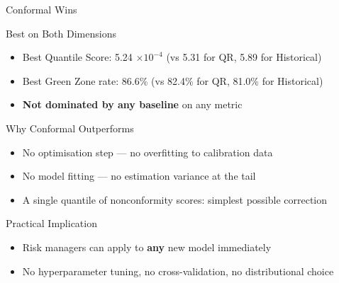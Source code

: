 \documentclass[9pt, aspectratio=169, t]{beamer}
\begin{document}
\begin{frame}{Conformal Wins}
	\vspace{-0.3cm}
	{\footnotesize
	\begin{exampleblock}{Best on Both Dimensions}
		\begin{itemize}\setlength{\itemsep}{1pt}
			\item Best Quantile Score: 5.24 $\times 10^{-4}$ (vs 5.31 for QR, 5.89 for Historical)
			\item Best Green Zone rate: 86.6\% (vs 82.4\% for QR, 81.0\% for Historical)
			\item \textbf{Not dominated by any baseline} on any metric
		\end{itemize}
	\end{exampleblock}
	\begin{block}{Why Conformal Outperforms}
		\begin{itemize}\setlength{\itemsep}{1pt}
			\item No optimisation step --- no overfitting to calibration data
			\item No model fitting --- no estimation variance at the tail
			\item A single quantile of nonconformity scores: simplest possible correction
		\end{itemize}
	\end{block}
	\begin{exampleblock}{Practical Implication}
		\begin{itemize}\setlength{\itemsep}{1pt}
			\item Risk managers can apply to \textbf{any} new model immediately
			\item No hyperparameter tuning, no cross-validation, no distributional choice
		\end{itemize}
	\end{exampleblock}
	}
\end{frame}
\end{document}
